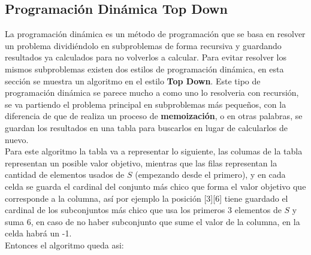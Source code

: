 \documentclass[a4paper]{article}
\begin{document}
\subsection{Programaci\'on Din\'amica Top Down}
La programación dinámica es un método de programación que se basa en resolver un problema dividiéndolo en subproblemas de forma recursiva y guardando resultados ya calculados para no volverlos a calcular. Para evitar resolver los mismos subproblemas existen dos estilos de programación dinámica, en esta sección se muestra un algoritmo en el estilo \textbf{Top Down}.
Este tipo de programación dinámica se parece mucho a como uno lo resolveria con recursión, se va partiendo el problema principal en subproblemas más pequeños, con la diferencia de que de realiza un proceso de \textbf{memoización}, o en otras palabras, se guardan los resultados en una tabla para buscarlos en lugar de calcularlos de nuevo.
\\
Para este algoritmo la tabla va a representar lo siguiente, las columas de la tabla representan un posible valor objetivo, mientras que las filas representan la cantidad de elementos usados de $S$ (empezando desde el primero), y en cada celda se guarda el cardinal del conjunto más chico que forma el valor objetivo que corresponde a la columna, así por ejemplo la posición [3][6] tiene guardado el cardinal de los subconjuntos más chico que usa los primeros 3 elementos de $S$ y suma $6$, en caso de no haber subconjunto que sume el valor de la columna, en la celda habrá un -1.
\\
Entonces el algoritmo queda asi:
\end{document}
